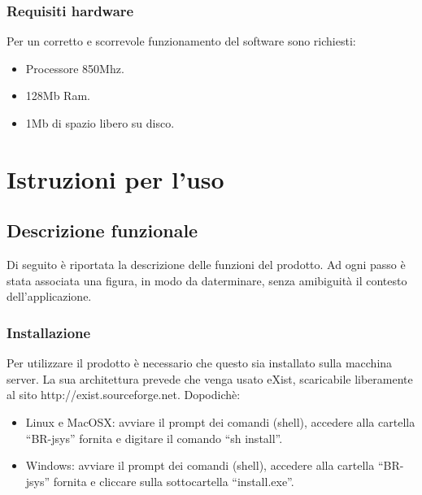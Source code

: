 \subsection{Requisiti hardware}
Per un corretto e scorrevole funzionamento del software sono richiesti:
\begin{itemize}
\item Processore 850Mhz.
\item 128Mb Ram.
\item 1Mb di spazio libero su disco.
\end{itemize}

\chapter{Istruzioni per l'uso}
\section{Descrizione funzionale}
Di seguito \`e riportata la descrizione delle funzioni del prodotto. Ad ogni passo \`e stata associata una figura, in modo da daterminare, senza amibiguit\`a il contesto dell'applicazione.
\subsection{Installazione}
Per utilizzare il prodotto \`e necessario che questo sia installato sulla macchina server. La sua architettura prevede che venga usato eXist, scaricabile liberamente al sito http://exist.sourceforge.net. Dopodich\`e:
\begin{itemize}
\item Linux e MacOSX: avviare il prompt dei comandi (shell), accedere alla cartella ``BR-jsys'' fornita e digitare il comando ``sh install''.
\item Windows: avviare il prompt dei comandi (shell), accedere alla cartella ``BR-jsys'' fornita e cliccare sulla sottocartella ``install.exe''.
\end{itemize}

